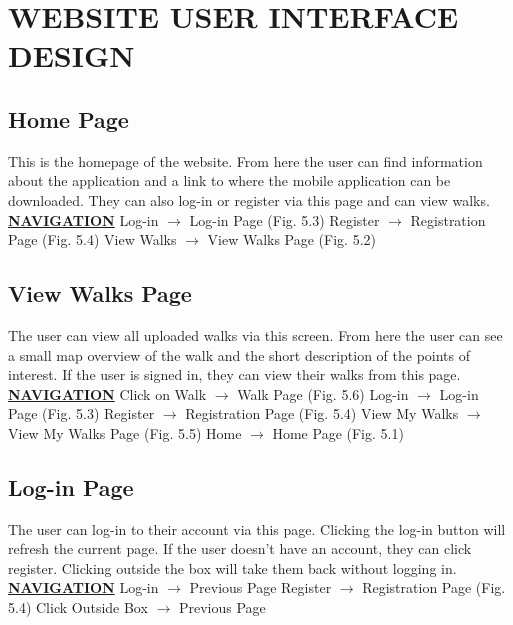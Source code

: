 \documentclass[12pt]{article}
\begin{document}
\section{WEBSITE USER INTERFACE DESIGN}
\subsection{Home Page}
\par{This is the homepage of the website. From here the user can find information about the
application and a link to where the mobile application can be downloaded. They can also
log-in or register via this page and can view walks.} \newline
\textbf{\underline{NAVIGATION}} \newline
Log-in $\rightarrow$ Log-in Page (Fig. 5.3) \newline
Register $\rightarrow$ Registration Page (Fig. 5.4) \newline
View Walks $\rightarrow$ View Walks Page (Fig. 5.2)\newline
\subsection{View Walks Page}
\par{The user can view all uploaded walks via this screen. From here the user can see a small map
overview of the walk and the short description of the points of interest. If the user is signed in,
they can view their walks from this page.}\newline
\textbf{\underline{NAVIGATION}} \newline
Click on Walk $\rightarrow$ Walk Page (Fig. 5.6) \newline
Log-in $\rightarrow$ Log-in Page (Fig. 5.3) \newline
Register $\rightarrow$ Registration Page (Fig. 5.4) \newline
View My Walks $\rightarrow$ View My Walks Page (Fig. 5.5) \newline
Home $\rightarrow$ Home Page (Fig. 5.1) \newline
\subsection{Log-in Page}
\par{The user can log-in to their account via this page. Clicking the log-in button will refresh the
current page. If the user doesn’t have an account, they can click register. Clicking outside the
box will take them back without logging in.}\newline
\textbf{\underline{NAVIGATION}} \newline
Log-in $\rightarrow$ Previous Page \newline
Register $\rightarrow$ Registration Page (Fig. 5.4) \newline
Click Outside Box $\rightarrow$ Previous Page \newline
\end{document}
